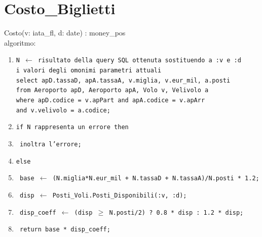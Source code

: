 \documentclass[a4paper,12pt]{report}
\begin{document}
      \section{Costo\_Biglietti}
        Costo(v: iata\_fl, d: date) : money\_pos \\
        \hspace*{1cm}algoritmo:
        \begin{enumerate}[label*=\arabic*]
          \item \texttt{N $\leftarrow$ risultato della query SQL ottenuta sostituendo a :v e :d \\
            \hspace*{1cm} i valori degli omonimi parametri attuali \\
            \hspace*{1cm} select apD.tassaD, apA.tassaA, v.miglia, v.eur\_mil, a.posti \\
            \hspace*{1cm} from Aeroporto apD, Aeroporto apA, Volo v, Velivolo a \\
            \hspace*{1cm} where apD.codice = v.apPart and apA.codice = v.apArr \\
            \hspace*{1cm} and v.velivolo = a.codice;}
          \item \texttt{if N rappresenta un errore then}
          \item \texttt{\hspace*{1cm} inoltra l'errore;}
          \item \texttt{else}
          \item \texttt{\hspace*{1cm} base $\leftarrow$ (N.miglia*N.eur\_mil + N.tassaD + N.tassaA)/N.posti * 1.2;}
          \item \texttt{\hspace*{1cm} disp $\leftarrow$ Posti\_Voli.Posti\_Disponibili(:v, :d);}
          \item \texttt{\hspace*{1cm} disp\_coeff $\leftarrow$ (disp $\geq$ N.posti/2) ? 0.8 * disp : 1.2 * disp;}
          \item \texttt{\hspace*{1cm} return base * disp\_coeff;}
        \end{enumerate}

      \newpage
\end{document}
